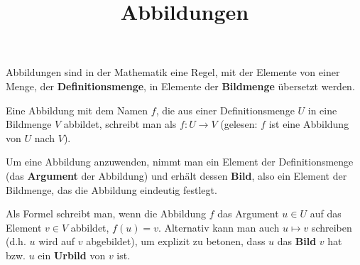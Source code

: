 \documentclass[solution]{uebungsblatt}
\title{Abbildungen}
\begin{document}
\maketitle

\begin{remark}
\parpic[r]{
}
Abbildungen sind in der Mathematik eine Regel, mit der Elemente von einer Menge, der \textbf{Definitionsmenge}, in Elemente der \textbf{Bildmenge} übersetzt werden.

Eine Abbildung mit dem Namen $f$, die aus einer Definitionsmenge $U$ in eine Bildmenge $V$ abbildet, schreibt man als $f\colon U\rightarrow V$ (gelesen: $f$ ist eine Abbildung von $U$ nach $V$).

Um eine Abbildung anzuwenden, nimmt man ein Element der Definitionsmenge (das \textbf{Argument} der Abbildung) und erhält dessen \textbf{Bild}, also ein Element der Bildmenge, das die Abbildung eindeutig festlegt. 

Als Formel schreibt man, wenn die Abbildung $f$ das Argument $u\in U$ auf das Element $v\in V$ abbildet, $f(u)=v$. Alternativ kann man auch $u\mapsto v$ schreiben (d.h. $u$ wird auf $v$ abgebildet), um explizit zu betonen, dass $u$ das \textbf{Bild} $v$ hat bzw. $u$ ein \textbf{Urbild} von $v$ ist.

\dotfill
\begin{center}
    \hspace*{6mm}
\end{center}

\end{remark}
\end{document}
